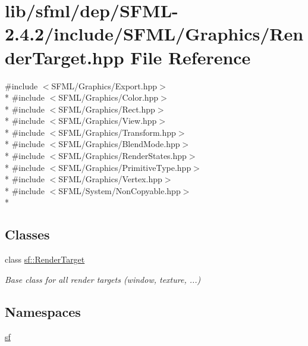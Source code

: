\hypertarget{sfml_2dep_2_s_f_m_l-2_84_82_2include_2_s_f_m_l_2_graphics_2_render_target_8hpp}{\section{lib/sfml/dep/\-S\-F\-M\-L-\/2.4.2/include/\-S\-F\-M\-L/\-Graphics/\-Render\-Target.hpp File Reference}
\label{sfml_2dep_2_s_f_m_l-2_84_82_2include_2_s_f_m_l_2_graphics_2_render_target_8hpp}
}
{\ttfamily \#include $<$S\-F\-M\-L/\-Graphics/\-Export.\-hpp$>$}\\*
{\ttfamily \#include $<$S\-F\-M\-L/\-Graphics/\-Color.\-hpp$>$}\\*
{\ttfamily \#include $<$S\-F\-M\-L/\-Graphics/\-Rect.\-hpp$>$}\\*
{\ttfamily \#include $<$S\-F\-M\-L/\-Graphics/\-View.\-hpp$>$}\\*
{\ttfamily \#include $<$S\-F\-M\-L/\-Graphics/\-Transform.\-hpp$>$}\\*
{\ttfamily \#include $<$S\-F\-M\-L/\-Graphics/\-Blend\-Mode.\-hpp$>$}\\*
{\ttfamily \#include $<$S\-F\-M\-L/\-Graphics/\-Render\-States.\-hpp$>$}\\*
{\ttfamily \#include $<$S\-F\-M\-L/\-Graphics/\-Primitive\-Type.\-hpp$>$}\\*
{\ttfamily \#include $<$S\-F\-M\-L/\-Graphics/\-Vertex.\-hpp$>$}\\*
{\ttfamily \#include $<$S\-F\-M\-L/\-System/\-Non\-Copyable.\-hpp$>$}\\*
\subsection*{Classes}
\begin{DoxyCompactItemize}
\item 
class \hyperlink{classsf_1_1_render_target}{sf\-::\-Render\-Target}
\begin{DoxyCompactList}\small\item\em Base class for all render targets (window, texture, ...) \end{DoxyCompactList}\end{DoxyCompactItemize}
\subsection*{Namespaces}
\begin{DoxyCompactItemize}
\item 
\hyperlink{namespacesf}{sf}
\end{DoxyCompactItemize}
